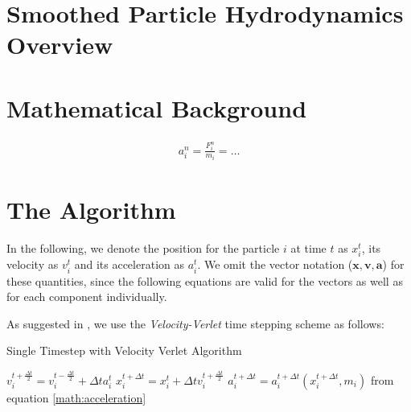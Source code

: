 \documentclass{sigchi}
\begin{document}
\section{Smoothed Particle Hydrodynamics Overview}
%

%

\section{Mathematical Background}
%
\begin{align}
	a_i^n = \frac{F_i^n}{m_i} = \dots
	\label{math:acceleration}
\end{align}

\section{The Algorithm}
%
In the following, we denote the position for the particle $i$ at time $t$ as $x_i^t$, its velocity as $v_i^t$ and its acceleration as $a_i^t$.
We omit the vector notation ($\boldsymbol{x},\boldsymbol{v},\boldsymbol{a}$) for these quantities, since the following equations are valid for the vectors as well as for each component individually.
\par\medskip
%
As suggested in \cite{generalizedwallboundary}, we use the \emph{Velocity-Verlet} time stepping scheme as follows:
%
\begin{algorithm}
	\caption{Single Timestep with Velocity Verlet Algorithm}
	$v_i^{t+\frac{\Delta t}{2}} = v_i^{t - \frac{\Delta t}{2}} + \Delta t a_i^t$ \;
	$x_i^{t+\Delta t} = x_i^t + \Delta t v_i^{t+\frac{\Delta t}{2}}$ \;	
	$a_i^{t + \Delta t} = a_i^{t + \Delta t} (x_i^{t + \Delta t}, m_i)$ from equation \ref{math:acceleration} \;
\end{algorithm}

\balance

\nocite{*}
\printbibliography

\begin{comment}
\clearpage

\section*{Appendix: Code}







\end{comment}
\end{document}
